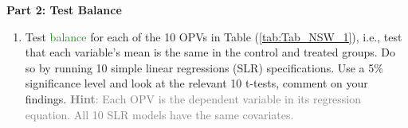 \documentclass[
]{article}
\newenvironment{Shaded}{\begin{snugshade}}{\end{snugshade}}
\newcommand{\AttributeTok}[1]{\textcolor[rgb]{0.13,0.29,0.53}{#1}}
\newcommand{\CommentTok}[1]{\textcolor[rgb]{0.56,0.35,0.01}{\textit{#1}}}
\newcommand{\ControlFlowTok}[1]{\textcolor[rgb]{0.13,0.29,0.53}{\textbf{#1}}}
\newcommand{\DecValTok}[1]{\textcolor[rgb]{0.00,0.00,0.81}{#1}}
\newcommand{\FunctionTok}[1]{\textcolor[rgb]{0.13,0.29,0.53}{\textbf{#1}}}
\newcommand{\NormalTok}[1]{#1}
\newcommand{\OtherTok}[1]{\textcolor[rgb]{0.56,0.35,0.01}{#1}}
\newcommand{\SpecialCharTok}[1]{\textcolor[rgb]{0.81,0.36,0.00}{\textbf{#1}}}
\newcommand{\StringTok}[1]{\textcolor[rgb]{0.31,0.60,0.02}{#1}}
\providecommand{\tightlist}{%
  \setlength{\itemsep}{0pt}\setlength{\parskip}{0pt}}
\begin{document}
\textbf{Part 2: Test Balance}

\begin{enumerate}
\def\labelenumi{\arabic{enumi}.}
\tightlist
\item
  Test \textcolor{ForestGreen}{balance} for each of the 10 OPVs in Table
  (\ref{tab:Tab_NSW_1}), i.e., test that each variable's mean is the
  same in the control and treated groups. Do so by running 10 simple
  linear regressions (SLR) specifications. Use a 5\% significance level
  and look at the relevant 10 t-tests, comment on your findings.
  \textcolor{gray}{\textbf{Hint}: Each OPV is the dependent variable in its regression equation. All 10 SLR models have the same covariates.}
\end{enumerate}

\begin{Shaded}
\end{Shaded}
\end{document}
